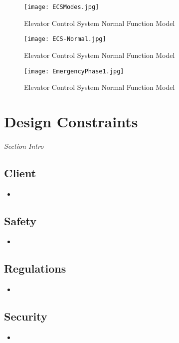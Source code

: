 \documentclass[12pt]{article}
\begin{document}
    \begin{figure}[H]
  		\centerline{\texttt{[image: ECSModes.jpg]}}
  		\caption{Elevator Control System Normal Function Model }
  		\label{fig:normal}
	\end{figure}

	\begin{figure}[H]
  	    \centerline{\texttt{[image: ECS-Normal.jpg]}}
  		\caption{Elevator Control System Normal Function Model }
  		\label{fig:normal}
	\end{figure}
	
	\begin{figure}[H]
  		\centerline{\texttt{[image: EmergencyPhase1.jpg]}}
  		\caption{Elevator Control System Normal Function Model }
  		\label{fig:emerg}
	\end{figure}

\section{Design Constraints} \label{cons} %
\paragraph{} \textit{Section Intro}

	\subsection{Client}
	\begin{itemize}
		\item 
	\end{itemize}

	\subsection{Safety}
	\begin{itemize}
		\item 
	\end{itemize}

	\subsection{Regulations}
	\begin{itemize}
		\item 
	\end{itemize}

	\subsection{Security}
	\begin{itemize}
		\item 
	\end{itemize}
\end{document}
